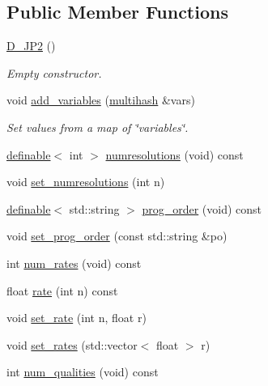 \subsection*{Public Member Functions}
\begin{DoxyCompactItemize}
\item 
\hyperlink{class_photo_finish_1_1_d___j_p2_a6d72a9eb9393447c707eb80e7fe2a834}{D\+\_\+\+J\+P2} ()
\begin{DoxyCompactList}\small\item\em Empty constructor. \end{DoxyCompactList}\item 
void \hyperlink{class_photo_finish_1_1_d___j_p2_a193a8087221647734efb84f5642af9c5}{add\+\_\+variables} (\hyperlink{namespace_photo_finish_a6f41796f162687538b7da5c7a95e2d18}{multihash} \&vars)
\begin{DoxyCompactList}\small\item\em Set values from a map of \char`\"{}variables\char`\"{}. \end{DoxyCompactList}\item 
\hyperlink{class_photo_finish_1_1definable}{definable}$<$ int $>$ \hyperlink{class_photo_finish_1_1_d___j_p2_a95c92c3a9bf8716601fa19d1a913645f}{numresolutions} (void) const
\item 
void \hyperlink{class_photo_finish_1_1_d___j_p2_a001a7b98c4a08077cf10cdd681a16527}{set\+\_\+numresolutions} (int n)
\item 
\hyperlink{class_photo_finish_1_1definable}{definable}$<$ std\+::string $>$ \hyperlink{class_photo_finish_1_1_d___j_p2_a4d7e7f3bb77d745b8137d30bb21f2f89}{prog\+\_\+order} (void) const
\item 
void \hyperlink{class_photo_finish_1_1_d___j_p2_aa346900750b65914d04252c994510c1d}{set\+\_\+prog\+\_\+order} (const std\+::string \&po)
\item 
int \hyperlink{class_photo_finish_1_1_d___j_p2_aea3de5fed9452b4a97f95e56edbe206b}{num\+\_\+rates} (void) const
\item 
float \hyperlink{class_photo_finish_1_1_d___j_p2_a326995b849ffec5727a9f34ebc5f89f3}{rate} (int n) const
\item 
void \hyperlink{class_photo_finish_1_1_d___j_p2_a0704300800c5413972531232266a50e5}{set\+\_\+rate} (int n, float r)
\item 
void \hyperlink{class_photo_finish_1_1_d___j_p2_a95a65c8461e7b2cadde20070c78a5ebb}{set\+\_\+rates} (std\+::vector$<$ float $>$ r)
\item 
int \hyperlink{class_photo_finish_1_1_d___j_p2_a17090a75cb97cdcdbd58bb0621c31fbe}{num\+\_\+qualities} (void) const

\end{DoxyCompactItemize}
